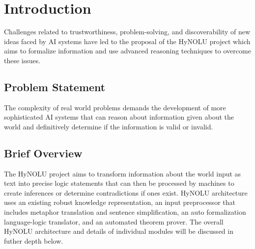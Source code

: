 

\chapter{Introduction}\label{ch:common}

Challenges related to trustworthiness, problem-solving, and discoverability of new ideas faced by AI systems have led to the proposal of the HyNOLU project which aims to formalize information and use advanced reasoning techniques to overcome these issues.

\section{Problem Statement}
The complexity of real world problems demands the development of more sophisticated AI systems
that can reason about information given about the world and definitively determine if the information is valid or invalid.

\section{Brief Overview}
The HyNOLU project aims to transform information about the world input as text into precise logic statements that can then be processed by machines to create inferences or determine contradictions if ones exist. HyNOLU architecture uses an existing robust knowledge representation, an input preprocessor that includes metaphor translation and sentence simplification, an auto formalization language-logic translator, and an automated theorem prover. The overall HyNOLU architecture and details of individual modules will be discussed in futher depth below.

